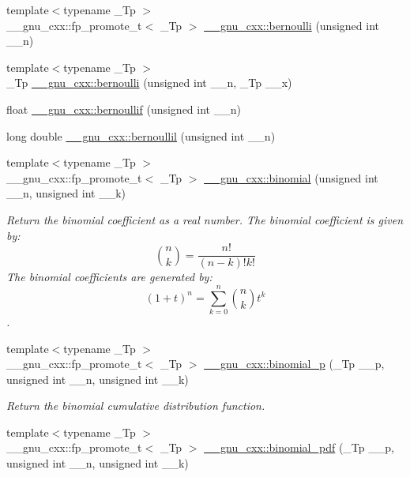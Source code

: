 \begin{DoxyCompactItemize}
{\footnotesize template$<$typename \+\_\+\+Tp $>$ }\\\+\_\+\+\_\+gnu\+\_\+cxx\+::fp\+\_\+promote\+\_\+t$<$ \+\_\+\+Tp $>$ \hyperlink{group__gnu__math__spec__func_gad339f0011df1967ec6c9e55bd1547bf4}{\+\_\+\+\_\+gnu\+\_\+cxx\+::bernoulli} (unsigned int \+\_\+\+\_\+n)
\item 
{\footnotesize template$<$typename \+\_\+\+Tp $>$ }\\\+\_\+\+Tp \hyperlink{group__gnu__math__spec__func_ga140e17e038ab0e3875c1b3fad09bc991}{\+\_\+\+\_\+gnu\+\_\+cxx\+::bernoulli} (unsigned int \+\_\+\+\_\+n, \+\_\+\+Tp \+\_\+\+\_\+x)
\item 
float \hyperlink{group__gnu__math__spec__func_gabcd77f012ae74989c4bb9ca61978481d}{\+\_\+\+\_\+gnu\+\_\+cxx\+::bernoullif} (unsigned int \+\_\+\+\_\+n)
\item 
long double \hyperlink{group__gnu__math__spec__func_gaac8f04abfdd6b744d11cb73ec1f564b1}{\+\_\+\+\_\+gnu\+\_\+cxx\+::bernoullil} (unsigned int \+\_\+\+\_\+n)
\item 
{\footnotesize template$<$typename \+\_\+\+Tp $>$ }\\\+\_\+\+\_\+gnu\+\_\+cxx\+::fp\+\_\+promote\+\_\+t$<$ \+\_\+\+Tp $>$ \hyperlink{group__gnu__math__spec__func_gabd0cf6e3f1e1d36c4c45f118e34a5ca2}{\+\_\+\+\_\+gnu\+\_\+cxx\+::binomial} (unsigned int \+\_\+\+\_\+n, unsigned int \+\_\+\+\_\+k)
\begin{DoxyCompactList}\small\item\em Return the binomial coefficient as a real number. The binomial coefficient is given by\+: \[ \binom{n}{k} = \frac{n!}{(n-k)! k!} \] The binomial coefficients are generated by\+: \[ \left(1 + t\right)^n = \sum_{k=0}^n \binom{n}{k} t^k \]. \end{DoxyCompactList}\item 
{\footnotesize template$<$typename \+\_\+\+Tp $>$ }\\\+\_\+\+\_\+gnu\+\_\+cxx\+::fp\+\_\+promote\+\_\+t$<$ \+\_\+\+Tp $>$ \hyperlink{group__gnu__math__spec__func_ga54276b9f03ad7b10e991b1681e0d2dd3}{\+\_\+\+\_\+gnu\+\_\+cxx\+::binomial\+\_\+p} (\+\_\+\+Tp \+\_\+\+\_\+p, unsigned int \+\_\+\+\_\+n, unsigned int \+\_\+\+\_\+k)
\begin{DoxyCompactList}\small\item\em Return the binomial cumulative distribution function. \end{DoxyCompactList}\item 
{\footnotesize template$<$typename \+\_\+\+Tp $>$ }\\\+\_\+\+\_\+gnu\+\_\+cxx\+::fp\+\_\+promote\+\_\+t$<$ \+\_\+\+Tp $>$ \hyperlink{group__gnu__math__spec__func_gab726f5ed3181466baa0374e723ab5fb2}{\+\_\+\+\_\+gnu\+\_\+cxx\+::binomial\+\_\+pdf} (\+\_\+\+Tp \+\_\+\+\_\+p, unsigned int \+\_\+\+\_\+n, unsigned int \+\_\+\+\_\+k)

\end{DoxyCompactItemize}
